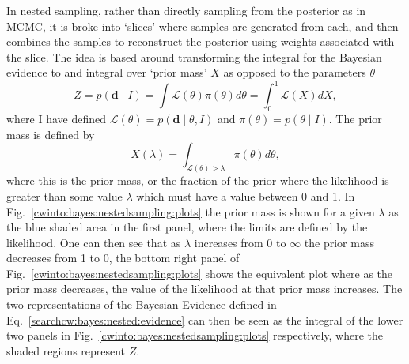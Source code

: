 In nested sampling, rather than directly sampling from the posterior as in \gls{MCMC}, it is broke into `slices' where samples are generated from each, and then combines the samples to reconstruct the posterior using weights associated with the slice.
The idea is based around transforming the integral for the Bayesian evidence to and integral over `prior mass' $X$ as opposed to the parameters $\theta$
\begin{equation}
\label{searchcw:bayes:nested:evidence}
	Z = p(\bm{d} \mid I) = \int \mathcal{L}(\theta) \pi(\theta) d\theta = \int_0^1 \mathcal{L}(X) dX,
\end{equation}
where I have defined $\mathcal{L}(\theta) = p(\bm{d} \mid \theta, I)$ and $\pi(\theta) = p(\theta \mid I)$.
The prior mass is defined by
\begin{equation}
\label{searchcw:bayes:nested:priormass}
	X(\lambda) = \int_{\mathcal{L}(\theta) > \lambda} \pi(\theta) d\theta,
\end{equation}
where this is the prior mass, or the fraction of the prior where the likelihood is greater than some value $\lambda$ which must have a value between 0 and 1.
In Fig.~\ref{cwinto:bayes:nestedsampling:plots} the prior mass is shown for a given $\lambda$ as the blue shaded area in the first panel, where the limits are defined by the likelihood.
One can then see that as $\lambda$ increases from 0 to $\infty$ the prior mass decreases from 1 to 0, the bottom right panel of Fig.~\ref{cwinto:bayes:nestedsampling:plots} shows the equivalent plot where as the prior mass decreases, the value of the likelihood at that prior mass increases.
The two representations of the Bayesian Evidence defined in Eq.~\ref{searchcw:bayes:nested:evidence} can then be seen as the integral of the lower two panels in Fig.~\ref{cwinto:bayes:nestedsampling:plots} respectively, where the shaded regions represent $Z$.
%
